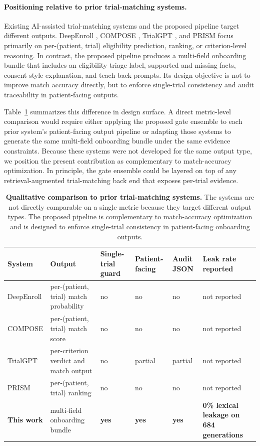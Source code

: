 \documentclass[pdflatex,Numbered]{sn-jnl}
\theoremstyle{plain}
\begin{document}
\paragraph{Positioning relative to prior trial-matching systems.}
Existing AI-assisted trial-matching systems and the proposed pipeline target different outputs. DeepEnroll \citep{zhang2020deepenroll}, COMPOSE \citep{gao2020compose}, TrialGPT \citep{jin2024trialgpt}, and PRISM \citep{gupta2024prism} focus primarily on per-(patient, trial) eligibility prediction, ranking, or criterion-level reasoning. In contrast, the proposed pipeline produces a multi-field onboarding bundle that includes an eligibility triage label, supported and missing facts, consent-style explanation, and teach-back prompts. Its design objective is not to improve match accuracy directly, but to enforce single-trial consistency and audit traceability in patient-facing outputs.

Table~\ref{tab:prior_systems} summarizes this difference in design surface. A direct metric-level comparison would require either applying the proposed gate ensemble to each prior system's patient-facing output pipeline or adapting those systems to generate the same multi-field onboarding bundle under the same evidence constraints. Because these systems were not developed for the same output type, we position the present contribution as complementary to match-accuracy optimization. In principle, the gate ensemble could be layered on top of any retrieval-augmented trial-matching back end that exposes per-trial evidence.

\begin{table}[!htbp]
\centering
\caption{\textbf{Qualitative comparison to prior trial-matching systems.} The systems are not directly comparable on a single metric because they target different output types. The proposed pipeline is complementary to match-accuracy optimization and is designed to enforce single-trial consistency in patient-facing onboarding outputs.}
\label{tab:prior_systems}
\small
\setlength{\tabcolsep}{4pt}
\begin{tabularx}{\linewidth}{l X X X X X}
\toprule
System & Output & Single-trial guard & Patient-facing & Audit JSON & Leak rate reported \\
\midrule
DeepEnroll \citep{zhang2020deepenroll}  & per-(patient, trial) match probability & no & no & no & not reported \\
COMPOSE \citep{gao2020compose}          & per-(patient, trial) match score       & no & no & no & not reported \\
TrialGPT \citep{jin2024trialgpt}        & per-criterion verdict and match output & no & partial & partial & not reported \\
PRISM \citep{gupta2024prism}            & per-(patient, trial) ranking           & no & no & no & not reported \\
\textbf{This work}                       & multi-field onboarding bundle          & \textbf{yes} & \textbf{yes} & \textbf{yes} & \textbf{0\% lexical leakage on 684 generations} \\
\bottomrule
\end{tabularx}
\end{table}
\end{document}
